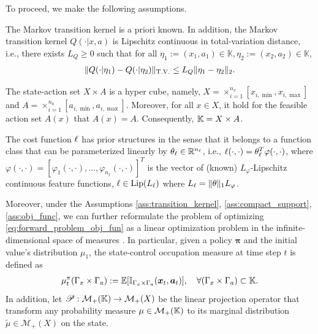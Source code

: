 To proceed, we make the following assumptions.
\begin{assumption}\label{ass:transition_kernel}
 The Markov transition kernel is a priori known. In addition, the Markov transition kernel $Q(\cdot|x,a)$ is Lipschitz continuous in total-variation distance, i.e., there exists $L_Q\ge 0$ such that for all $\eta_1:=(x_1,a_1)\in\mathbb{K},\eta_2:=(x_2,a_2)\in\mathbb{K}$, 
\begin{align*}
\|Q(\cdot|\eta_1)-Q(\cdot|\eta_2)\|_{\operatorname*{T.V.}}\le L_Q\|\eta_1-\eta_2\|_2.
\end{align*}
\end{assumption}
\begin{assumption}\label{ass:compact_support}
The state-action set $X\times A$ is a hyper cube, namely, $X=\times_{i=1}^{n_x}[x_{i,\min},x_{i,\max}]$ and $A = \times_{i=1}^{n_a}[a_{i,\min},a_{i,\max}]$. Moreover, for all $x\in X$, it hold for the feasible action set $A(x)$ that $A(x)=A$. Consequently, $\mathbb{K} = X\times A$.
\end{assumption}
\begin{assumption}\label{ass:obj_func}
  The cost function $\relax{\ell}$ has prior structures in the sense that it belongs to a function class that can be parameterized linearly by $\relax{\theta}_\ell\in\mathbb{R}^{n_\ell}$, i.e., $\relax{\ell}(\cdot,\cdot) = \relax{\theta}_\ell^T\varphi(\cdot,\cdot)$, where $\varphi(\cdot,\cdot) = [\varphi_1(\cdot,\cdot),\ldots,\varphi_{n_\ell}(\cdot,\cdot)]^T$ is the vector of (known) $L_\varphi$-Lipschitz continuous feature functions, $\relax{\ell} \in \operatorname*{Lip}(L_\ell)$ where $L_\ell = \|\relax{\theta}\|_1 L_\varphi$.
\end{assumption}
Moreover, under the Assumptions \ref{ass:transition_kernel}, \ref{ass:compact_support}, \ref{ass:obj_func}, we can further reformulate the problem of optimizing \eqref{eq:forward_problem_obj_fun} as a linear optimization problem in the infinite-dimensional space of measures \citep[Chap.~6]{hernandez2012discrete}.
In particular, given a policy $\bm{\pi}$ and the initial value's distribution $\mu_1$, the state-control occupation measure at time step $t$ is defined as
\begin{align*}
  \mu_t^\pi(\Gamma_x\times \Gamma_a) :=\operatorname*{\mathbb{E}}[\mathbb{I}_{\Gamma_x\times \Gamma_a}(\bm{x}_t,\bm{a}_t)],\quad \forall (\Gamma_x\times\Gamma_a)\subset\mathbb{K}.
\end{align*}
In addition, let $\mathscr{P}:\mathcal{M}_+(\mathbb{K})\rightarrow\mathcal{M}_+(X)$ be the linear projection operator that transform any probability measure $\mu\in\mathcal{M}_+(\mathbb{K})$ to its marginal distribution $\tilde{\mu}\in\mathcal{M}_+(X)$ on the state. 

